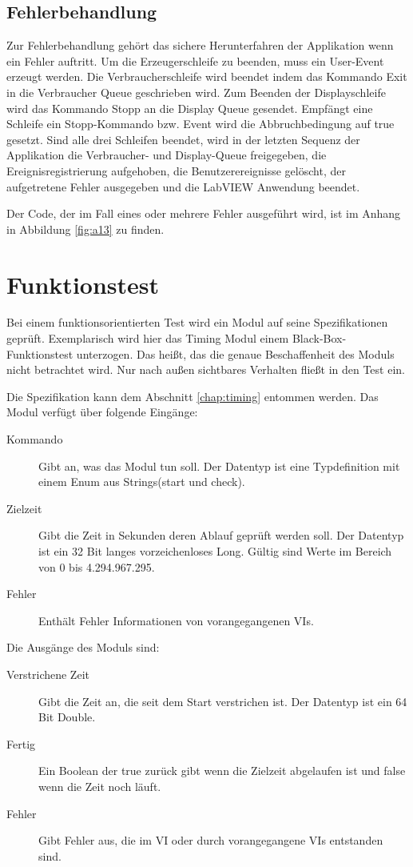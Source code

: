 \subsection{Fehlerbehandlung}
\label{chap:fehler}
Zur Fehlerbehandlung gehört das sichere Herunterfahren der Applikation wenn ein Fehler auftritt. Um die Erzeugerschleife zu beenden,
muss ein User-Event erzeugt werden. Die Verbraucherschleife wird beendet indem das Kommando Exit in die Verbraucher Queue geschrieben wird. 
Zum Beenden der Displayschleife wird das Kommando Stopp an die Display Queue gesendet. 
Empfängt eine Schleife  ein Stopp-Kommando bzw. Event wird die Abbruchbedingung auf true gesetzt. 
Sind alle drei Schleifen beendet, wird in der letzten Sequenz der Applikation die Verbraucher- und Display-Queue freigegeben, 
die Ereignisregistrierung aufgehoben, die Benutzerereignisse gelöscht, der aufgetretene Fehler ausgegeben und die LabVIEW Anwendung beendet.

Der Code, der im Fall eines oder mehrere Fehler ausgeführt wird, ist im Anhang in Abbildung \ref{fig:a13} zu finden.

\section{Funktionstest}

Bei einem funktionsorientierten Test wird ein Modul auf seine Spezifikationen geprüft. Exemplarisch wird hier das Timing Modul einem Black-Box-Funktionstest unterzogen. Das heißt, das die genaue Beschaffenheit des Moduls nicht betrachtet wird. Nur nach außen sichtbares Verhalten fließt in den Test ein.

Die Spezifikation kann dem Abschnitt \ref{chap:timing} entommen werden.  Das Modul verfügt über folgende Eingänge:

\begin{description}
\item[Kommando] Gibt an, was das Modul tun soll. Der Datentyp ist eine Typdefinition mit einem Enum aus Strings(start und check).
\item[Zielzeit] Gibt die Zeit in Sekunden deren Ablauf geprüft werden soll. Der Datentyp ist ein 32 Bit langes vorzeichenloses Long. Gültig sind Werte im Bereich von 0 bis 4.294.967.295.
\item[Fehler] Enthält Fehler Informationen von vorangegangenen VIs. 
\end{description}
Die Ausgänge des Moduls sind:

\begin{description}
\item[Verstrichene Zeit] Gibt die Zeit an, die seit dem Start verstrichen ist. Der Datentyp ist ein 64 Bit Double.
\item[Fertig] Ein Boolean der true zurück gibt wenn die Zielzeit abgelaufen ist und false wenn die Zeit noch läuft.
\item[Fehler] Gibt Fehler aus, die im VI oder durch vorangegangene VIs entstanden sind.
\end{description}

